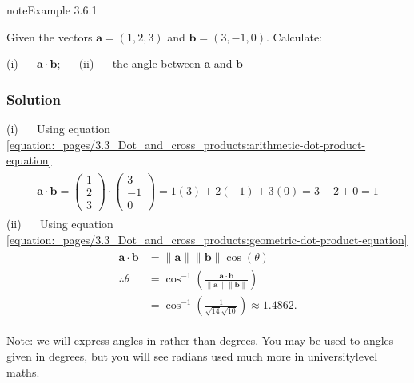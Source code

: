\documentclass[letterpaper,10pt,english]{jupyterBook}
\begin{document}
\label{_pages/3.3_Dot_and_cross_products:dot-product-example}
\begin{sphinxadmonition}{note}{Example 3.6.1}



\sphinxAtStartPar
Given the vectors \(\mathbf{a} = (1, 2, 3)\) and \(\mathbf{b} = (3, -1, 0)\). Calculate:

\sphinxAtStartPar
(i)   \(\mathbf{a} \cdot \mathbf{b}\);  
(ii)   the angle between \(\mathbf{a}\) and \(\mathbf{b}\)
\subsubsection*{Solution}

\sphinxAtStartPar
(i)   Using equation \eqref{equation:_pages/3.3_Dot_and_cross_products:arithmetic-dot-product-equation}
\begin{equation*}
\begin{split} \begin{align*}
    \mathbf{a} \cdot \mathbf{b} = \begin{pmatrix} 1 \\ 2 \\ 3 \end{pmatrix} \cdot \begin{pmatrix} 3 \\ -1 \\ 0 \end{pmatrix} = 1(3) + 2(-1) + 3(0) = 3 - 2 + 0 = 1
\end{align*} \end{split}
\end{equation*}
\sphinxAtStartPar
(ii)   Using equation \eqref{equation:_pages/3.3_Dot_and_cross_products:geometric-dot-product-equation}
\begin{equation*}
\begin{split} \begin{align*}
    \mathbf{a} \cdot \mathbf{b} &= \|\mathbf{a}\| \|\mathbf{b}\| \cos(\theta) \\
    \therefore \theta &= \cos^{-1} \left( \frac{\mathbf{a} \cdot \mathbf{b}}{\|\mathbf{a}\|\|\mathbf{b}\|}\right) \\
    &= \cos^{-1} \left( \frac{1}{\sqrt{14}\sqrt{10}}\right) \approx 1.4862.
\end{align*} \end{split}
\end{equation*}\end{sphinxadmonition}

\sphinxAtStartPar
Note: we will express angles in  rather than degrees. You may be used to angles given in degrees, but you will see radians used much more in university\sphinxhyphen{}level maths.
\end{document}
